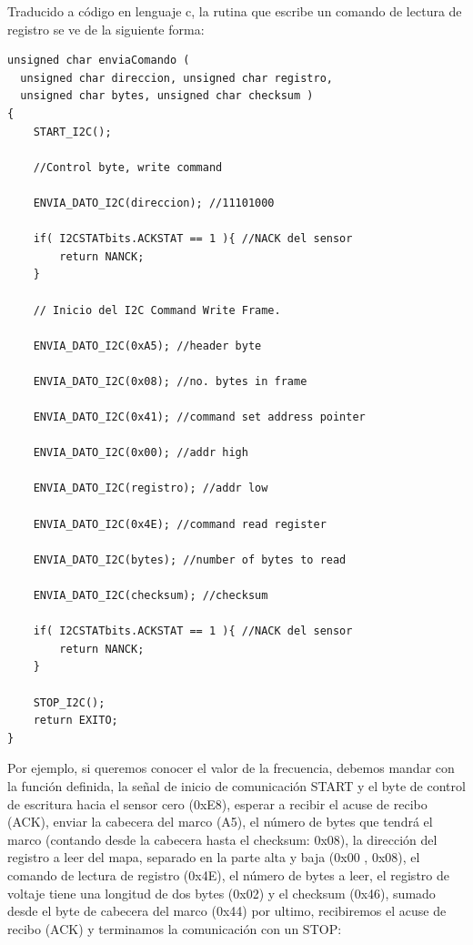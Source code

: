 Traducido a código en lenguaje c, la rutina que escribe un comando de lectura de registro se ve de la siguiente forma:

\begin{lstlisting}[language={[x86masm]Assembler}]
unsigned char enviaComando ( 
  unsigned char direccion, unsigned char registro, 
  unsigned char bytes, unsigned char checksum )
{
    START_I2C();
 
    //Control byte, write command
    
    ENVIA_DATO_I2C(direccion); //11101000   
    
    if( I2CSTATbits.ACKSTAT == 1 ){ //NACK del sensor
        return NANCK;
    }

    // Inicio del I2C Command Write Frame.
    
    ENVIA_DATO_I2C(0xA5); //header byte
        
    ENVIA_DATO_I2C(0x08); //no. bytes in frame
    
    ENVIA_DATO_I2C(0x41); //command set address pointer
   
    ENVIA_DATO_I2C(0x00); //addr high
     
    ENVIA_DATO_I2C(registro); //addr low 

    ENVIA_DATO_I2C(0x4E); //command read register
    
    ENVIA_DATO_I2C(bytes); //number of bytes to read 
    
    ENVIA_DATO_I2C(checksum); //checksum   
   
    if( I2CSTATbits.ACKSTAT == 1 ){ //NACK del sensor
        return NANCK;
    }
          
    STOP_I2C();
    return EXITO;
}

\end{lstlisting}

Por ejemplo, si queremos conocer el valor de la frecuencia, debemos mandar con la función definida, la señal de inicio de comunicación START y el byte de control de escritura hacia el sensor cero (0xE8), esperar a recibir el acuse de recibo (ACK), enviar la cabecera del marco (A5), el número de bytes que tendrá el marco (contando desde la cabecera hasta el checksum: 0x08), la dirección del registro a leer del mapa, separado en la parte alta y baja (0x00 , 0x08), el comando de lectura de registro (0x4E), el número de bytes a leer, el registro de voltaje tiene una longitud de dos bytes (0x02) y el checksum (0x46), sumado desde el byte de cabecera del marco (0x44) por ultimo, recibiremos el acuse de recibo (ACK) y terminamos la comunicación con un STOP:

